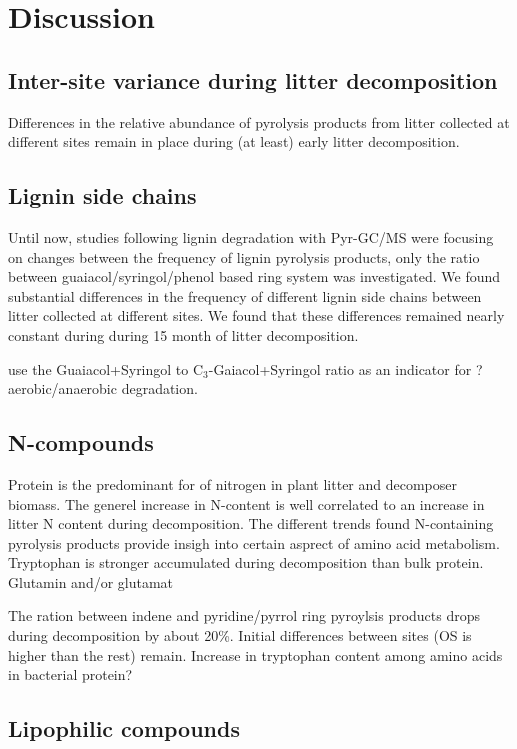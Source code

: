 \documentclass[preprint,review,12pt]{elsarticle}
\begin{document}
\section{Discussion}

\subsection{Inter-site variance during litter decomposition}
Differences in the relative abundance of pyrolysis products from litter collected at different sites remain in place during (at least) early litter decomposition.  

\subsection{Lignin side chains}
Until now, studies following lignin degradation with Pyr-GC/MS were focusing on changes between the frequency of lignin pyrolysis products, only the ratio between guaiacol/syringol/phenol based ring system was investigated. We found substantial differences in the frequency of different lignin side chains between litter collected at different sites. We found that these differences remained nearly constant during during 15 month of litter decomposition.

\cite{Kuder1998, Schellekens2009} use the Guaiacol+Syringol to C$_3$-Gaiacol+Syringol ratio as an indicator for ?aerobic/anaerobic degradation. 

\subsection{N-compounds}

Protein is the predominant for of nitrogen in plant litter and decomposer biomass. The generel increase in N-content is well correlated to an increase in litter N content during decomposition. The different trends found N-containing pyrolysis products provide insigh into certain asprect of amino acid metabolism. Tryptophan is stronger accumulated during decomposition than bulk protein. Glutamin and/or glutamat

The ration between indene and pyridine/pyrrol ring pyroylsis products drops during decomposition by about 20\%. Initial differences between sites (OS is higher than the rest) remain.
Increase in tryptophan content among amino acids in bacterial protein?

\subsection{Lipophilic compounds}
\end{document}
